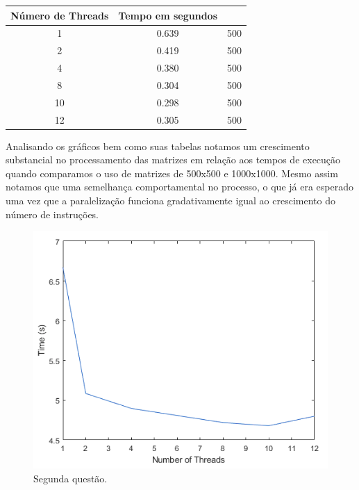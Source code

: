 \documentclass[letterpaper, 10 pt, conference]{ieeeconf}
\begin{document}
\begin{table}[!h]
\begin{tabular}{|c|c|c|}
\hline
	Número de Threads & Tempo em segundos \\
	\hline\hline
	1 & 0.639 & 500\\
	\hline
    2 & 0.419 & 500\\
    \hline
    4 & 0.380 & 500\\
    \hline
    8 & 0.304 & 500\\
    \hline
    10 & 0.298 & 500\\
    \hline
    12 & 0.305 & 500\\
\hline
\end{tabular}
\end{table}

Analisando os gráficos bem como suas tabelas notamos um crescimento substancial no processamento das matrizes em relação aos tempos de execução quando comparamos o uso de matrizes de 500x500 e 1000x1000. Mesmo assim notamos que uma semelhança comportamental no processo, o que já era esperado uma vez que a paralelização funciona gradativamente igual ao crescimento do número de instruções.

\begin{figure}[htbp]
\centering
\includegraphics[width=0.97\columnwidth]{Figuras/img6.png}
\caption{Segunda questão.}
\label{stability}
\end{figure}
\end{document}
